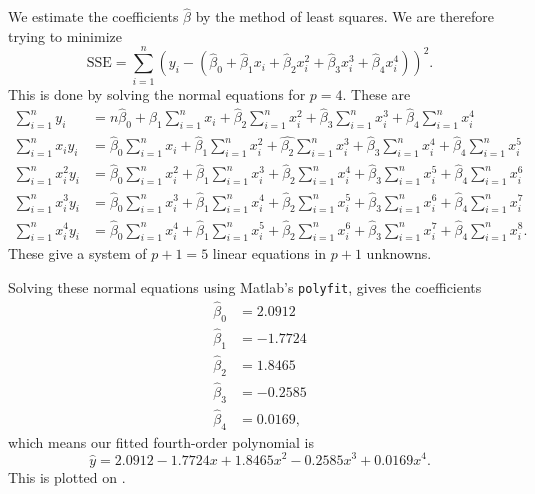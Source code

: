 \begin{derivation}
      We estimate the coefficients $\hat{\beta}$ by the method of least squares.
      We are therefore trying to minimize
      \begin{equation*}
        \text{SSE} = \sum_{i = 1}^{n} \left( y_i - \left( \hat{\beta}_0 + \hat{\beta}_1 x_i + \hat{\beta}_2 x_i^2 + \hat{\beta}_3 x_i^3 + \hat{\beta}_4 x_i^{4}  \right) \right)^2
      .\end{equation*}
      This is done by solving the normal equations for $p = 4$.
      These are
      \begin{align*}
        \sum_{i = 1}^{n} y_i &= n \hat{\beta}_0 + \hat{\beta}_1 \sum_{i = 1}^{n} x_i + \hat{\beta}_2 \sum_{i =1}^{n} x_i^2 + \hat{\beta}_3 \sum_{i = 1}^{n} x_i^3 + \hat{\beta}_4 \sum_{i = 1}^{n} x_i^{4}\\
        \sum_{i = 1}^{n} x_i y_i &= \hat{\beta}_0 \sum_{i = 1}^{n} x_i + \hat{\beta}_1 \sum_{i = 1}^{n} x_i^2 + \hat{\beta_2} \sum_{i = 1}^{n} x_i^3 + \hat{\beta}_3 \sum_{i = 1}^{n} x_i^{4} + \hat{\beta}_4 \sum_{i = 1}^{n} x_i^{5} \\
        \sum_{i = 1}^{n} x_i^2 y_i &= \hat{\beta}_0 \sum_{i = 1}^{n} x_i^2 + \hat{\beta}_1 \sum_{i = 1}^{n} x_i^3 + \hat{\beta}_2 \sum_{i = 1}^{n} x_i^{4} + \hat{\beta}_3 \sum_{i = 1}^{n} x_i^{5} + \hat{\beta}_4 \sum_{i = 1}^{n} x_i^{6} \\
        \sum_{i = 1}^{n} x_i^3 y_i &= \hat{\beta}_0 \sum_{i = 1}^{n} x_i^3 + \hat{\beta}_1 \sum_{i = 1}^{n} x_i^{4} + \hat{\beta}_2 \sum_{i = 1}^{n} x_i^{5} + \hat{\beta}_3 \sum_{i = 1}^{n} x_i^{6} + \hat{\beta}_4 \sum_{i = 1}^{n} x_i^{7} \\
        \sum_{i = 1}^{n} x_i^{4}y_i &= \hat{\beta}_0 \sum_{i = 1}^{n} x_i^{4} + \hat{\beta}_1 \sum_{i = 1}^{n} x_i^{5} + \hat{\beta}_2 \sum_{i = 1}^{n} x_i^{6} + \hat{\beta}_3 \sum_{i = 1}^{n} x_i^{7} + \hat{\beta}_4 \sum_{i = 1}^{n} x_i^{8}
      .\end{align*}
      These give a system of $p + 1 = 5$ linear equations in $p + 1$ unknowns.

      Solving these normal equations using Matlab's \verb#polyfit#, gives the coefficients
      \begin{align*}
        \hat{\beta}_0 &= \num{2,0912}  \\
        \hat{\beta}_1 &= \num{-1,7724}  \\
        \hat{\beta}_2 &= \num{1,8465}  \\
        \hat{\beta}_3 &= \num{-0,2585}  \\
        \hat{\beta}_4 &= \num{0,0169}
      ,\end{align*}
      which means our fitted fourth-order polynomial is
      \begin{equation*}
        \hat{y} = \num{2,0912} - \num{1,7724} x + \num{1,8465} x^2 - \num{0,2585} x^3 + \num{0,0169} x^{4}
      .\end{equation*}
      This is plotted on .


\end{derivation}
